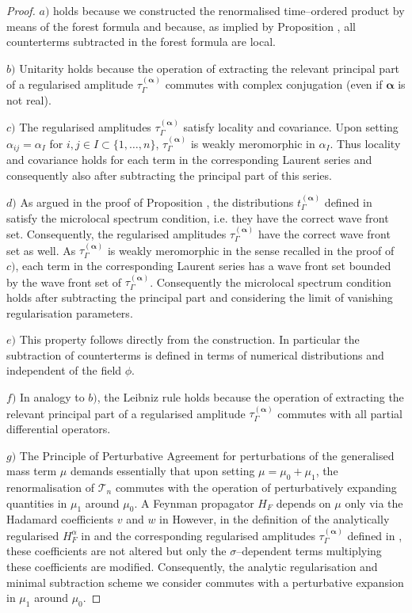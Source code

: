 \documentclass[10pt]{book}
\theoremstyle{break}
\newtheorem{proof}{Proof}
\begin{document}
\begin{proof}
$a)$ holds because we constructed the renormalised time--ordered product by means of the forest formula %
and because, as implied by Proposition %
, all counterterms subtracted in the forest formula are local.

$b)$ Unitarity holds because the operation of extracting the relevant principal part of a regularised amplitude $\tau^{(\boldsymbol{\alpha})}_\Gamma$ commutes with complex conjugation (even if $\boldsymbol{\alpha}$ is not real).

$c)$ The regularised amplitudes $\tau^{(\boldsymbol{\alpha})}_\Gamma$ satisfy locality and covariance. Upon setting $\alpha_{ij}=\alpha_I$ for $i,j\in I\subset \{1,\dots,n\}$, $\tau^{(\boldsymbol{\alpha})}_\Gamma$ is weakly meromorphic in $\alpha_I$. Thus locality and covariance holds for each term in the corresponding Laurent series and consequently also after subtracting the principal part of this series.

$d)$ As argued in the proof of Proposition%
, the distributions $t^{(\boldsymbol{\alpha})}_\Gamma$ defined in %
satisfy the microlocal spectrum condition, i.e. they have the correct wave front set. Consequently, the regularised amplitudes $\tau^{(\boldsymbol{\alpha})}_\Gamma$ have the correct wave front set as well. As $\tau^{(\boldsymbol{\alpha})}_\Gamma$ is weakly meromorphic in the sense recalled in the proof of $c)$, each term in the corresponding Laurent series has a wave front set bounded by the wave front set of $\tau^{(\boldsymbol{\alpha})}_\Gamma$. Consequently the microlocal spectrum condition holds after subtracting the principal part and considering the limit of vanishing regularisation parameters.

$e)$ This property follows directly from the construction. In particular the subtraction of counterterms is defined in terms of numerical distributions and independent of the field $\phi$.

$f)$ In analogy to $b)$, the Leibniz rule holds because the operation of extracting the relevant principal part of a regularised amplitude $\tau^{(\boldsymbol{\alpha})}_\Gamma$ commutes with all partial differential operators.

$g)$ The Principle of Perturbative Agreement for perturbations of the generalised mass term $\mu$ demands essentially that upon setting $\mu=\mu_0 + \mu_1$, the renormalisation of $\mathcal{T}_n$ commutes with the operation of perturbatively expanding quantities in $\mu_1$ around $\mu_0$. A Feynman propagator $H_F$ depends on $\mu$ only via the Hadamard coefficients $v$ and $w$ in %
However, in the definition of the analytically regularised $H^{\alpha}_F$ in %
and the corresponding regularised amplitudes $\tau^{(\boldsymbol{\alpha})}_\Gamma$ defined in %
, these coefficients are not altered but only the $\sigma$--dependent terms multiplying these coefficients are modified. Consequently, the analytic regularisation and minimal subtraction scheme we consider commutes with a perturbative expansion in $\mu_1$ around $\mu_0$.


\end{proof}
\end{document}
